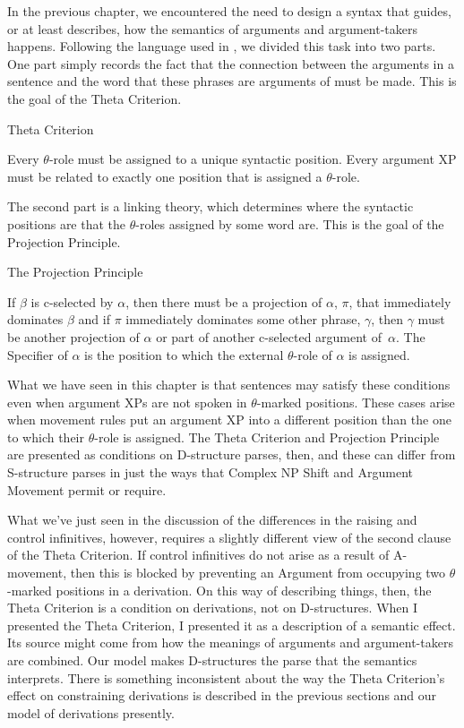 In the previous chapter, we encountered the need to design a syntax that guides, or at least describes, how the semantics of arguments and argument-takers happens. Following the language used in \citet{Chomsky:1981}, we divided this task into two parts. One part simply records the fact that the connection between the arguments in a sentence and the word that these phrases are arguments of must be made. This is the goal of the Theta Criterion.
\begin{exe}
	\raggedright
	\ex \label{ex3:tc2} Theta Criterion
	\begin{xlist}
		\ex Every $\theta$-role must be assigned to a unique syntactic position.
		\ex Every argument XP must be related to exactly one position that is assigned a $\theta$-role.
	\end{xlist}
\end{exe}
The second part is a linking theory, which determines where the syntactic positions are that the $\theta$-roles assigned by some word are. This is the goal of the Projection Principle.
\begin{exe}
	\raggedright
	\ex \label{ex3:pp2} The Projection Principle
	\begin{xlist}
		\ex If $\beta$ is c-selected by $\alpha$, then there must be a projection of $\alpha$, $\pi$, that immediately dominates $\beta$ and if $\pi$ immediately dominates some other phrase, $\gamma$, then $\gamma$ must be another projection of $\alpha$ or part of another c-selected argument of~$\alpha$.
		\ex The Specifier of $\alpha$ is the position to which the external $\theta$-role of $\alpha$ is assigned.
	\end{xlist}
\end{exe}
What we have seen in this chapter is that sentences may satisfy these conditions even when argument XPs are not spoken in $\theta$-marked positions. These cases arise when movement rules put an argument XP into a different position than the one to which their $\theta$-role is assigned. The Theta Criterion and Projection Principle are presented as conditions on D-structure parses, then, and these can differ from S-structure parses in just the ways that Complex NP Shift and Argument Movement permit or require.

What we've just seen in the discussion of the differences in the raising and control infinitives, however, requires a slightly different view of the second clause of the Theta Criterion. If control infinitives do not arise as a result of A-movement, then this is blocked by preventing an Argument from occupying two $\theta$-marked positions in a derivation. On this way of describing things, then, the Theta Criterion is a condition on derivations, not on D-structures. When I presented the Theta Criterion, I presented it as a description of a semantic effect. Its source might come from how the meanings of arguments and argument-takers are combined. Our model makes D-structures the parse that the semantics interprets. There is something inconsistent about the way the Theta Criterion's effect on constraining derivations is described in the previous sections and our model of derivations presently. 

